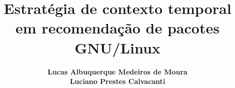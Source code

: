 
\title[Estratégia de contexto temporal em recomendação de pacotes GNU/Linux]
{\textbf{\Large{Estratégia de contexto temporal em recomendação de pacotes GNU/Linux}}
}

\author[Lucas, Luciano]%
{\textbf{\small{
Lucas Albuquerque Medeiros de Moura\\
Luciano Prestes Calvacanti\\
}}}
\date{} %
